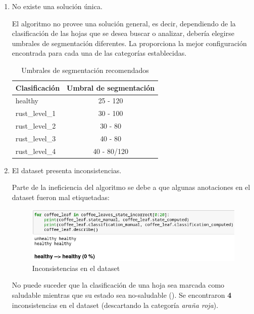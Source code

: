 \begin{enumerate}
\item No existe una solución única.

El algoritmo no provee una solución general, es decir, dependiendo de la clasificación de las hojas que se desea buscar o analizar, debería elegirse umbrales de segmentación diferentes. La  proporciona la mejor configuración encontrada para cada una de las categorías establecidas.

\begin{table}[H]
\centering
\begin{tabular}{|l|c|}
\hline 
\textbf{Clasificación} & \textbf{Umbral de segmentación} \\ 
\hline 
healthy & 25 - 120 \\ 
\hline 
rust\_level\_1 & 30 - 100 \\ 
\hline 
rust\_level\_2 & 30 - 80 \\ 
\hline 
rust\_level\_3 & 40 - 80 \\ 
\hline 
rust\_level\_4 & 40 - 80/120 \\ 
\hline 
\end{tabular}
\caption{Umbrales de segmentación recomendados}
\label{table:recommended_segmentation}
\end{table}

\item El dataset presenta inconsistencias.

Parte de la ineficiencia del algoritmo se debe a que algunas anotaciones en el dataset fueron mal etiquetadas:

\begin{figure}[H]
\centering
\includegraphics[width=\textwidth]{images/consideration_tag_error.png}
\caption{Inconsistencias en el dataset}
\label{img:dataset_inconsistencies}
\end{figure}

No puede suceder que la clasificación de una hoja sea marcada como saludable mientras que su estado sea no-saludable (). Se encontraron \textbf{4} inconsistencias en el dataset (descartando la categoría \textit{araña roja}).

\end{enumerate}


